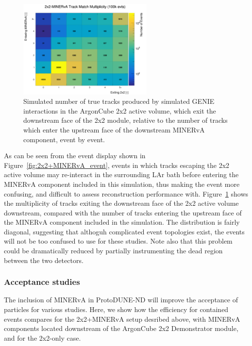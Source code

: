 \begin{figure}[htb]
  \centering
  \includegraphics[width=0.6\textwidth]{plots/2x2_minerva_plots/track_mathch_topo.png}
  \caption{Simulated number of true tracks produced by simulated GENIE interactions in the ArgonCube 2x2 active volume, which exit the downstream face of the 2x2 module, relative to the number of tracks which enter the upstream face of the downstream MINERvA component, event by event.}
  \label{fig:track_multiplicity_topo}
\end{figure}
As can be seen from the event display shown in Figure~\ref{fig:2x2+MINERvA_event}, events in which tracks escaping the 2x2 active volume may re-interact in the surrounding LAr bath before entering the MINERvA component included in this simulation, thus making the event more confusing, and difficult to assess reconstruction performance with. Figure~\ref{fig:track_multiplicity_topo} shows the multiplicity of tracks exiting the downstream face of the 2x2 active volume downstream, compared with the number of tracks entering the upstream face of the MINERvA component included in the simulation. The distribution is fairly diagonal, suggesting that althoguh complicated event topologies exist, the events will not be too confused to use for these studies. Note also that this problem could be dramatically reduced by partially instrumenting the dead region between the two detectors.

\subsubsection{Acceptance studies}
\label{sec:minerva-acceptance}
The inclusion of MINERvA in ProtoDUNE-ND will improve the acceptance of particles for various studies. Here, we show how the efficiency for contained events compares for the 2x2+MINERvA setup desribed above, with MINERvA components located downstream of the ArgonCube 2x2 Demonstrator module, and for the 2x2-only case.

